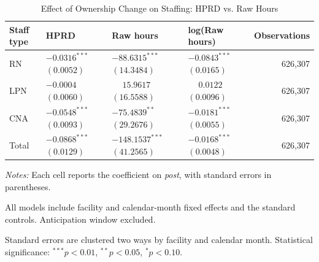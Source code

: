 \documentclass[12pt]{article}
\begin{document}

\begin{table}[H]
\centering
\begin{threeparttable}
\caption{Effect of Ownership Change on Staffing: HPRD vs. Raw Hours}
\label{tab:staffing-hprd-vs-hours}
\small
\setlength{\tabcolsep}{6pt}
\begin{tabularx}{\textwidth}{@{} l Y Y Y r @{}}
\toprule
Staff type & HPRD & Raw hours & log(Raw hours) & Observations \\
\midrule
RN &  &  &  & 626,307 \\
LPN &  &  &  & 626,307 \\
CNA &  &  &  & 626,307 \\
Total &  &  &  & 626,307 \\
\bottomrule
\end{tabularx}

\begin{tablenotes}[flushleft]
\footnotesize
\item \textit{Notes:} Each cell reports the coefficient on \textit{post}, with standard errors in parentheses.
\item All models include facility and calendar-month fixed effects and the standard controls. Anticipation window excluded.
\item Standard errors are clustered two ways by facility and calendar month. Statistical significance: $^{***}p<0.01$, $^{**}p<0.05$, $^{*}p<0.10$.
\end{tablenotes}
\end{threeparttable}
\end{table}
\end{document}
